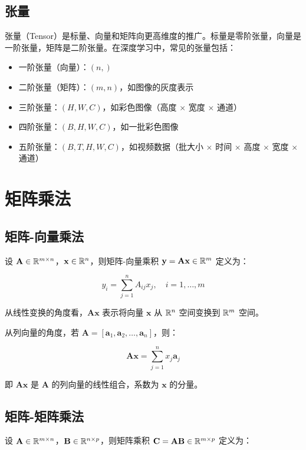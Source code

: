 \subsection{张量}

张量（Tensor）是标量、向量和矩阵向更高维度的推广。标量是零阶张量，向量是一阶张量，矩阵是二阶张量。在深度学习中，常见的张量包括：

\begin{itemize}
    \item 一阶张量（向量）：$(n,)$
    \item 二阶张量（矩阵）：$(m, n)$，如图像的灰度表示
    \item 三阶张量：$(H, W, C)$，如彩色图像（高度 $\times$ 宽度 $\times$ 通道）
    \item 四阶张量：$(B, H, W, C)$，如一批彩色图像
    \item 五阶张量：$(B, T, H, W, C)$，如视频数据（批大小 $\times$ 时间 $\times$ 高度 $\times$ 宽度 $\times$ 通道）
\end{itemize}

\section{矩阵乘法}

\subsection{矩阵-向量乘法}

设 $\mathbf{A}\in\mathbb{R}^{m\times n}$，$\mathbf{x}\in\mathbb{R}^n$，则矩阵-向量乘积 $\mathbf{y}=\mathbf{A}\mathbf{x}\in\mathbb{R}^m$ 定义为：

\[
y_i = \sum_{j=1}^{n} A_{ij} x_j, \quad i=1,\ldots,m
\]

从线性变换的角度看，$\mathbf{A}\mathbf{x}$ 表示将向量 $\mathbf{x}$ 从 $\mathbb{R}^n$ 空间变换到 $\mathbb{R}^m$ 空间。

从列向量的角度，若 $\mathbf{A}=[\mathbf{a}_1,\mathbf{a}_2,\ldots,\mathbf{a}_n]$，则：

\[
\mathbf{A}\mathbf{x} = \sum_{j=1}^{n} x_j \mathbf{a}_j
\]

即 $\mathbf{A}\mathbf{x}$ 是 $\mathbf{A}$ 的列向量的线性组合，系数为 $\mathbf{x}$ 的分量。

\subsection{矩阵-矩阵乘法}

设 $\mathbf{A}\in\mathbb{R}^{m\times n}$，$\mathbf{B}\in\mathbb{R}^{n\times p}$，则矩阵乘积 $\mathbf{C}=\mathbf{A}\mathbf{B}\in\mathbb{R}^{m\times p}$ 定义为：

